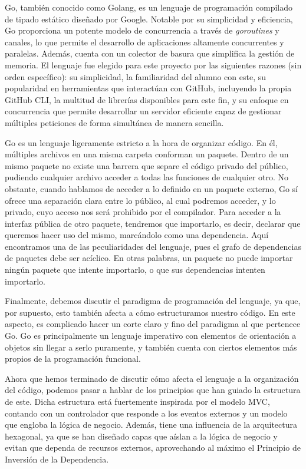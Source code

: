 Go, también conocido como Golang, es un lenguaje de programación compilado de tipado estático diseñado por Google. Notable por su simplicidad y eficiencia, Go proporciona un potente modelo de concurrencia a través de \textit{goroutines} y canales, lo que permite el desarrollo de aplicaciones altamente concurrentes y paralelas\cite{stackoverflowWhatapossGreat}. Además, cuenta con un colector de basura que simplifica la gestión de memoria\cite{golangGuideGarbage}. El lenguaje fue elegido para este proyecto por las siguientes razones (sin orden específico): su simplicidad, la familiaridad del alumno con este, su popularidad en herramientas que interactúan con GitHub, incluyendo la propia GitHub CLI\cite{githubGitHubClicli}, la multitud de librerías disponibles para este fin, y su enfoque en concurrencia que permite desarrollar un servidor eficiente capaz de gestionar múltiples peticiones de forma simultánea de manera sencilla.

Go es un lenguaje ligeramente estricto a la hora de organizar código. En él, múltiples archivos en una misma carpeta conforman un paquete. Dentro de un mismo paquete no existe una barrera que separe el código privado del público, pudiendo cualquier archivo acceder a todas las funciones de cualquier otro. No obstante, cuando hablamos de acceder a lo definido en un paquete externo, Go sí ofrece una separación clara entre lo público, al cual podremos acceder, y lo privado, cuyo acceso nos será prohibido por el compilador. Para acceder a la interfaz pública de otro paquete, tendremos que importarlo, es decir, declarar que queremos hacer uso del mismo, marcándolo como una dependencia. Aquí encontramos una de las peculiaridades del lenguaje, pues el grafo de dependencias de paquetes debe ser acíclico. En otras palabras, un paquete no puede importar ningún paquete que intente importarlo, o que sus dependencias intenten importarlo.

Finalmente, debemos discutir el paradigma de programación del lenguaje, ya que, por supuesto, esto también afecta a cómo estructuramos nuestro código. En este aspecto, es complicado hacer un corte claro y fino del paradigma al que pertenece Go. Go es principalmente un lenguaje imperativo con elementos de orientación a objetos sin llegar a serlo puramente\cite{goFAQOOP}, y también cuenta con ciertos elementos más propios de la programación funcional\cite{goCodewalkFirstClass}.

Ahora que hemos terminado de discutir cómo afecta el lenguaje a la organización del código, podemos pasar a hablar de los principios que han guiado la estructura de este. Dicha estructura está fuertemente inspirada por el modelo \acrshort{MVC}\cite{universitetetiosloTrygveMVC}, contando con un controlador que responde a los eventos externos y un modelo que engloba la lógica de negocio. Además, tiene una influencia de la arquitectura hexagonal\cite{cockburnHexagonalArchitecture}, ya que se han diseñado capas que aíslan a la lógica de negocio y evitan que dependa de recursos externos, aprovechando al máximo el Principio de Inversión de la Dependencia\cite{Martin2002-yw}.

